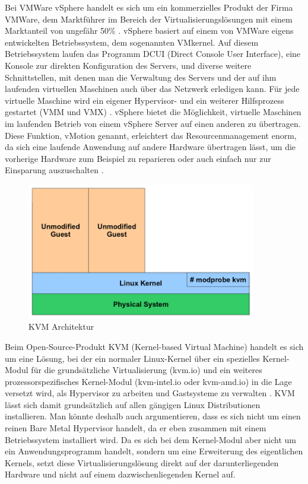Bei VMWare vSphere handelt es sich um ein kommerzielles Produkt der Firma VMWare, dem Marktführer im Bereich der Virtualisierungslösungen mit einem Marktanteil von ungefähr 50\% \citep[Vgl.][]{vmware:001}. vSphere basiert auf einem von VMWare eigens entwickelten Betriebssystem, dem sogenannten VMkernel. Auf diesem Betriebssystem laufen das Programm DCUI (Direct Console User Interface), eine Konsole zur direkten Konfiguration des Servers, und diverse weitere Schnittstellen, mit denen man die Verwaltung des Servers und der auf ihm laufenden virtuellen Maschinen auch über das Netzwerk erledigen kann. Für jede virtuelle Maschine wird ein eigener Hypervisor- und ein weiterer Hilfsprozess gestartet (VMM und VMX) \citep[Vgl.][S. 3]{vmware:002}. vSphere bietet die Möglichkeit, virtuelle Maschinen im laufenden Betrieb von einem vSphere Server auf einen anderen zu übertragen. Diese Funktion, vMotion genannt, erleichtert das Resourcenmanagement enorm, da sich eine laufende Anwendung auf andere Hardware übertragen lässt, um die vorherige Hardware zum Beispiel zu reparieren oder auch einfach nur zur Einsparung auszuschalten \citep[Vgl.][S. 4]{wmware:003}.

\begin{figure}[!ht]
  \begin{center}
    \includegraphics[width=10cm]{bilder/kvm.png}
    \caption{KVM Architektur \citep{kvm:002}}
  \end{center}
\end{figure}

Beim Open-Source-Produkt KVM (Kernel-based Virtual Machine) handelt es sich um eine Lösung, bei der ein normaler Linux-Kernel über ein spezielles Kernel-Modul für die grundsätzliche Virtualisierung (kvm.io) und ein weiteres prozessorspezifisches Kernel-Modul (kvm-intel.io oder kvm-amd.io) in die Lage versetzt wird, als Hypervisor zu arbeiten und Gastsysteme zu verwalten \citep[Vgl.][S. 225 - 227]{KivKam07}. KVM lässt sich damit grundsätzlich auf allen gängigen Linux Distributionen installieren. Man könnte deshalb auch argumentieren, dass es sich nicht um einen reinen Bare Metal Hypervisor handelt, da er eben zusammen mit einem Betriebssystem installiert wird. Da es sich bei dem Kernel-Modul aber nicht um ein Anwendungsprogramm handelt, sondern um eine Erweiterung des eigentlichen Kernels, setzt diese Virtualisierungslösung direkt auf der darunterliegenden Hardware und nicht auf einem dazwischenliegenden Kernel auf.

